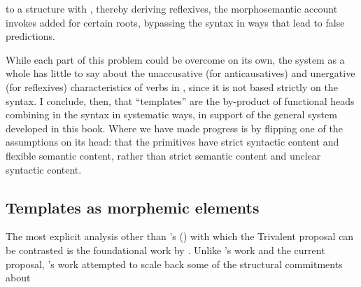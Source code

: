 \begin{exe}
\begin{xlist}
\begin{xlist}
\begin{exe}
\begin{xlist}
\begin{xlist}
\begin{exe}
\begin{xlist}
\begin{xlist}
\begin{exe}
\begin{exe}
\begin{xlist}
\begin{exe}
\begin{exe}
\begin{xlist}
\begin{exe}
\begin{exe}
\begin{exe}
\begin{exe}
\begin{exe}
\begin{xlist}
\begin{exe}
\begin{xlist}
\begin{exe}
\begin{exe}
\begin{xlist}
\begin{exe}
\begin{xlist}
\begin{exe}
\begin{xlist}
\begin{exe}
\begin{exe}
\begin{exe}
\begin{xlist}
\begin{exe}
\begin{exe}
\begin{exe}
\begin{xlist}
\begin{exe}
\begin{xlist}
\begin{exe}
\begin{xlist}
\begin{exe}
\begin{xlist}
\begin{exe}
\begin{exe}
\begin{exe}
\begin{exe}
\begin{xlist}
\begin{exe}
\begin{xlist}
\begin{exe}
\begin{xlist}
\begin{exe}
\begin{xlist}
\begin{exe}
\begin{xlist}
\begin{exe}
\begin{xlist}
\begin{exe}
\begin{exe}
\begin{exe}
\begin{exe}
\begin{xlist}
\begin{exe}
\begin{xlist}
\begin{exe}
\begin{xlist}
\begin{exe}
\begin{exe}
\begin{xlist}
\begin{exe}
\begin{xlist}
\begin{exe}
\begin{exe}
\begin{exe}
\begin{exe}
\begin{xlist}
\begin{xlist}
\begin{exe}
\begin{xlist}
\begin{exe}
\begin{exe}
\begin{exe}
\begin{xlist}
\begin{exe}
\begin{exe}
\begin{xlist}
\begin{exe}
\begin{exe}
\begin{exe}
\begin{xlist}
\begin{xlist}
\begin{exe}
\begin{xlist}
\begin{exe}
\begin{exe}
\begin{exe}
\begin{exe}
\begin{xlist}
\begin{exe}
\begin{xlist}
\begin{exe}
\begin{xlist}
\begin{exe}
\begin{xlist}
\begin{exe}
\begin{exe}
\begin{exe}
\begin{exe}
\begin{exe}
\begin{exe}
\begin{xlist}
\begin{exe}
\begin{xlist}
\begin{exe}
\begin{xlist}
\begin{exe}
\begin{xlist}
\begin{exe}
\begin{xlist}
\begin{exe}
\begin{xlist}
\begin{exe}
\begin{xlist}
\begin{exe}
\begin{xlist}
 to a structure with \vz, thereby deriving reflexives, the morphosemantic account invokes added  for certain roots, bypassing the syntax in ways that lead to false predictions.

While each part of this problem could be overcome on its own, the system as a whole has little to say about the unaccusative (for anticausatives) and unergative (for reflexives) characteristics of verbs in {\thit}, since it is not based strictly on the syntax. I conclude, then, that ``templates'' are the by-product of functional heads combining in the syntax in systematic ways, in support of the general system developed in this book. Where we have made progress is by flipping one of the assumptions on its head: that the primitives have strict syntactic content and flexible semantic content, rather than strict semantic content and unclear syntactic content.
	\subsection{Templates as morphemic elements} \label{vz:others:morph}
The most explicit analysis other than \citeauthor{doron03}'s (\citeyear{doron03}) with which the Trivalent proposal can be contrasted is the foundational work by \cite{arad03,arad05}. Unlike \citeauthor{doron03}'s work and the current proposal, \cite{arad05}'s work attempted to scale back some of the structural commitments about 
\end{xlist}
\end{exe}
\end{xlist}
\end{exe}
\end{xlist}
\end{exe}
\end{xlist}
\end{exe}
\end{xlist}
\end{exe}
\end{xlist}
\end{exe}
\end{xlist}
\end{exe}
\end{xlist}
\end{exe}
\end{exe}
\end{exe}
\end{exe}
\end{exe}
\end{exe}
\end{xlist}
\end{exe}
\end{xlist}
\end{exe}
\end{xlist}
\end{exe}
\end{xlist}
\end{exe}
\end{exe}
\end{exe}
\end{exe}
\end{xlist}
\end{exe}
\end{xlist}
\end{xlist}
\end{exe}
\end{exe}
\end{exe}
\end{xlist}
\end{exe}
\end{exe}
\end{xlist}
\end{exe}
\end{exe}
\end{exe}
\end{xlist}
\end{exe}
\end{xlist}
\end{xlist}
\end{exe}
\end{exe}
\end{exe}
\end{exe}
\end{xlist}
\end{exe}
\end{xlist}
\end{exe}
\end{exe}
\end{xlist}
\end{exe}
\end{xlist}
\end{exe}
\end{xlist}
\end{exe}
\end{exe}
\end{exe}
\end{exe}
\end{xlist}
\end{exe}
\end{xlist}
\end{exe}
\end{xlist}
\end{exe}
\end{xlist}
\end{exe}
\end{xlist}
\end{exe}
\end{xlist}
\end{exe}
\end{exe}
\end{exe}
\end{exe}
\end{xlist}
\end{exe}
\end{xlist}
\end{exe}
\end{xlist}
\end{exe}
\end{xlist}
\end{exe}
\end{exe}
\end{exe}
\end{xlist}
\end{exe}
\end{exe}
\end{exe}
\end{xlist}
\end{exe}
\end{xlist}
\end{exe}
\end{xlist}
\end{exe}
\end{exe}
\end{xlist}
\end{exe}
\end{xlist}
\end{exe}
\end{exe}
\end{exe}
\end{exe}
\end{exe}
\end{xlist}
\end{exe}
\end{exe}
\end{xlist}
\end{exe}
\end{exe}
\end{xlist}
\end{xlist}
\end{exe}
\end{xlist}
\end{xlist}
\end{exe}
\end{xlist}
\end{xlist}
\end{exe}

